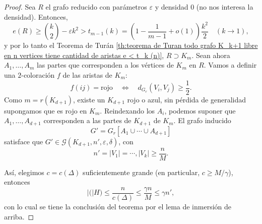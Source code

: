 \documentclass[12pt]{report}
\theoremstyle{plain}
\theoremstyle{definition}
\newcommand{\abs}[1]{\left \vert #1 \right \vert}
\begin{document}
\begin{proof}
Sea $R$ el grafo reducido con parámetros $\varepsilon$ y densidad $0$ (no nos interesa la densidad). Entonces,
\[
    e(R) \geq \binom k 2     - \varepsilon k^2 > t_{m-1} (k) = \left ( 1 - \frac{1}{m-1} + o(1) \right) \frac{k^2}{2}  \quad (k \longrightarrow 1),
\]
y por lo tanto el Teorema de Turán \ref{th:teorema de Turan todo grafo K_k+1 libre en n vertices tiene cantidad de aristas e < t_k (n)}, $R \supset K_m$. Sean ahora $A_1, \ldots, A_m$ las partes que corresponden a los vértices de $K_m$ en $R$. Vamos a definir una $2$-coloración $f$ de las aristas de $K_m$:
\[
    f(ij) = \text{rojo} \quad \Leftrightarrow \quad d_{G_r} (V_i, V_j) \geq \frac{1}{2}.
\]
Como $m = r (K_{d + 1})$, existe un $K_{d + 1}$ rojo o azul, sin pérdida de generalidad supongamos que es rojo en $K_m$. Reindexando los $A_i$, podemos suponer que $A_1, \ldots, A_{d+1}$ corresponden a las partes de $K_{d+1}$ de $K_m$. El grafo inducido
\[
    G' = G_r [A_1 \cup \cdots \cup A_{d+1}]
\]
satisface que $G' \in \mathcal G (K_{d+1}, n', \varepsilon, \delta)$, con
\[
    n' = \abs{V_1} = \cdots, \abs{V_k} \geq \frac{n}{M}.
\]

Así, elegimos $c = c(\Delta)$ suficientemente grande (en particular, $c \geq M/\gamma$), entonces
\[
    \abs (H) \leq \frac{n}{c(\Delta)} \leq \frac{\gamma n}{M} \leq \gamma n',
\]
con lo cual se tiene la conclusión del teorema por el lema de inmersión de arriba.
\end{proof}










%





\newpage


{}

\end{document}
